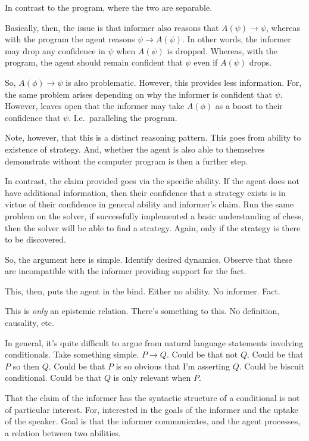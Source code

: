 \documentclass[10pt]{article}
\begin{document}
\begin{note}
In contrast to the program, where the two are separable.

Basically, then, the issue is that informer also reasons that \(A(\psi) \rightarrow \psi\), whereas with the program the agent reasons \(\psi \rightarrow A(\psi)\).
In other words, the informer may drop any confidence in \(\psi\) when \(A(\psi)\) is dropped.
Whereas, with the program, the agent should remain confident that \(\psi\) even if \(A(\psi)\) drops.

So, \(A(\phi) \rightarrow \psi\) is also problematic.
However, this provides less information.
For, the same problem arises depending on why the informer is confident that \(\psi\).
However, leaves open that the informer may take \(A(\phi)\) as a boost to their confidence that \(\psi\).
I.e.\ paralleling the program.

Note, however, that this is a distinct reasoning pattern.
This goes from ability to existence of strategy.
And, whether the agent is also able to themselves demonstrate without the computer program is then a further step.

In contrast, the claim provided goes via the specific ability.
If the agent does not have additional information, then their confidence that a strategy exists is in virtue of their confidence in general ability and informer's claim.
Run the same problem on the solver, if successfully implemented a basic understanding of chess, then the solver will be able to find a strategy.
Again, only if the strategy is there to be discovered.
\end{note}


So, the argument here is simple.
Identify desired dynamics.
Observe that these are incompatible with the informer providing support for the fact.

This, then, puts the agent in the bind.
Either no ability.
No informer.
Fact.

This is \emph{only} an epistemic relation.
There's something to this.
No definition, causality, etc.

In general, it's quite difficult to argue from natural language statements involving conditionals.
Take something simple.
\(P \rightarrow Q\).
Could be that not \(Q\).
Could be that \(P\) so then \(Q\).
Could be that \(P\) is so obvious that I'm asserting \(Q\).
Could be biscuit conditional.
Could be that \(Q\) is only relevant when \(P\).

That the claim of the informer has the syntactic structure of a conditional is not of particular interest.
For, interested in the goals of the informer and the uptake of the speaker.
Goal is that the informer communicates, and the agent processes, a relation between two abilities.
\end{document}
